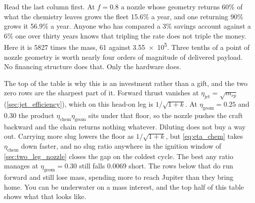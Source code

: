 \documentclass{article}
\begin{document}
Read the last column first. At $f = 0.8$ a nozzle whose geometry returns 60\% of what the chemistry leaves grows the fleet 15.6\% a year, and one returning 90\% grows it 56.9\% a year. Anyone who has compared a 3\% savings account against a 6\% one over thirty years knows that tripling the rate does not triple the money. Here it is \num{5827} times the mass, 61 against \num{3.55e5}. Three tenths of a point of nozzle geometry is worth nearly four orders of magnitude of delivered payload. No financing structure does that. Only the hardware does.

The top of the table is why this is an investment rather than a gift, and the two zero rows are the sharpest part of it. Forward thrust vanishes at $\eta_{\mathrm{jet}} = \sqrt{m_{rp}}$ (\autoref{sec:jet_efficiency}), which on this head-on leg is $1/\sqrt{1+k}$. At $\eta_{\mathrm{geom}} = 0.25$ and $0.30$ the product $\eta_{\mathrm{chem}}\eta_{\mathrm{geom}}$ sits under that floor, so the nozzle pushes the craft backward and the chain returns nothing whatever. Diluting does not buy a way out. Carrying more slug lowers the floor as $1/\sqrt{1+k}$, but \autoref{eq:eta_chem} takes $\eta_{\mathrm{chem}}$ down faster, and no slug ratio anywhere in the ignition window of \autoref{sec:two_leg_nozzle} closes the gap on the coldest cycle. The best any ratio manages at $\eta_{\mathrm{geom}} = 0.30$ still falls \num{0.0069} short. The rows below that do run forward and still lose mass, spending more to reach Jupiter than they bring home. You can be underwater on a mass interest, and the top half of this table shows what that looks like.
\end{document}
